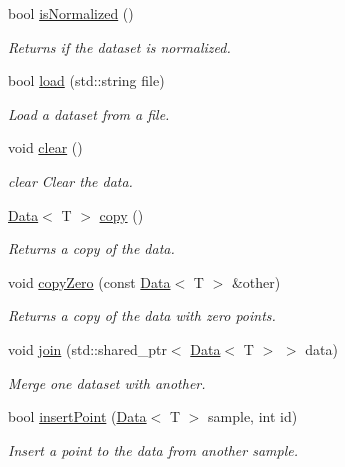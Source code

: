 \begin{DoxyCompactItemize}
bool \mbox{\hyperlink{class_data_a6b91ca6585e8638f1b359a6f2bb827d7}{is\+Normalized}} ()
\begin{DoxyCompactList}\small\item\em Returns if the dataset is normalized. \end{DoxyCompactList}\item 
bool \mbox{\hyperlink{class_data_a1d15d02eb38c6fb9ebf5d29ecafe7eee}{load}} (std\+::string file)
\begin{DoxyCompactList}\small\item\em Load a dataset from a file. \end{DoxyCompactList}\item 
\mbox{\label{class_data_a3fc15f7a8c270b72af86951d6955608d}} 
void \mbox{\hyperlink{class_data_a3fc15f7a8c270b72af86951d6955608d}{clear}} ()
\begin{DoxyCompactList}\small\item\em clear Clear the data. \end{DoxyCompactList}\item 
\mbox{\hyperlink{class_data}{Data}}$<$ T $>$ \mbox{\hyperlink{class_data_ae1cc8dec46ae498a0d00f4e573edc795}{copy}} ()
\begin{DoxyCompactList}\small\item\em Returns a copy of the data. \end{DoxyCompactList}\item 
void \mbox{\hyperlink{class_data_ad94f8c8227a298b5cc0a862658f8cb99}{copy\+Zero}} (const \mbox{\hyperlink{class_data}{Data}}$<$ T $>$ \&other)
\begin{DoxyCompactList}\small\item\em Returns a copy of the data with zero points. \end{DoxyCompactList}\item 
void \mbox{\hyperlink{class_data_abf57674d356299c2be916331791e8f12}{join}} (std\+::shared\+\_\+ptr$<$ \mbox{\hyperlink{class_data}{Data}}$<$ T $>$ $>$ data)
\begin{DoxyCompactList}\small\item\em Merge one dataset with another. \end{DoxyCompactList}\item 
bool \mbox{\hyperlink{class_data_a2357782011d11c06500b1d752b9428c6}{insert\+Point}} (\mbox{\hyperlink{class_data}{Data}}$<$ T $>$ sample, int id)
\begin{DoxyCompactList}\small\item\em Insert a point to the data from another sample. \end{DoxyCompactList}\item 

\end{DoxyCompactItemize}
